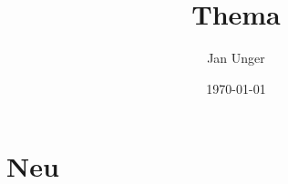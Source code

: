 \documentclass{vorlage-design-main}
\title{Thema}
\author{Jan Unger}
\date{\today}
\begin{document}
\maketitle

\begin{abstract}

\end{abstract}

\hypertarget{neu}{%
\section{Neu}\label{neu}} %


\clearpage
\printbibliography
\end{document}
